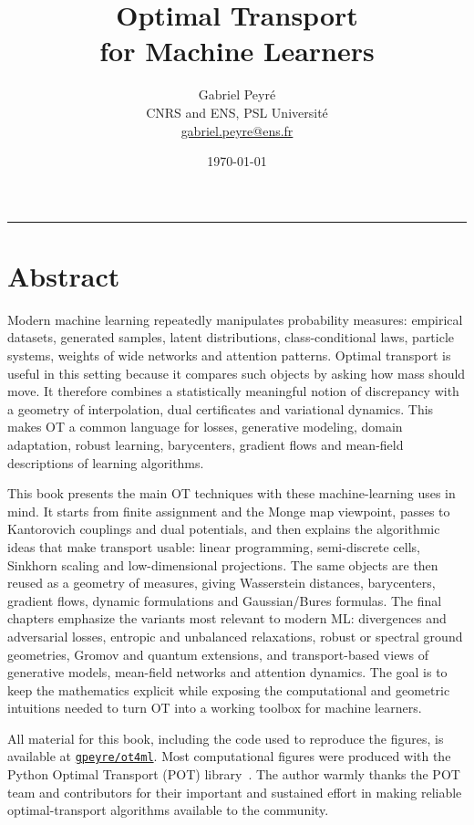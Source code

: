 \documentclass[10pt,a4paper,twoside,openany]{book}
\title{Optimal Transport\\for Machine Learners}
\author{%
\begin{tabular}{c}
	Gabriel Peyr{\'e} \\ CNRS and ENS, PSL Universit\'e \\
	 \url{gabriel.peyre@ens.fr}
\end{tabular}
}
\date{\today}
\makeatletter
\renewcommand{\maketitle}{%
\begin{titlepage}
\thispagestyle{empty}
\vspace*{.08\textheight}
\noindent{\color{otblue}\rule{\textwidth}{1.1pt}}\par
\vspace{1.4cm}
{\centering\fontsize{30}{36}\selectfont\bfseries\color{otblue}\@title\par}
\vspace{1.2cm}
{\centering\large\@author\par}
\vfill
\begin{center}
{\color{otred}\rule{.38\textwidth}{2pt}}\par
\vspace{.65cm}
{\large\@date\par}
\end{center}
\end{titlepage}
}
\makeatother
\begin{document}
\hypersetup{pageanchor=false}
\maketitle
\cleardoublepage
\hypersetup{pageanchor=true}

\frontmatter

\chapter*{Abstract}
Modern machine learning repeatedly manipulates probability measures: empirical datasets, generated samples, latent distributions, class-conditional laws, particle systems, weights of wide networks and attention patterns. Optimal transport is useful in this setting because it compares such objects by asking how mass should move. It therefore combines a statistically meaningful notion of discrepancy with a geometry of interpolation, dual certificates and variational dynamics. This makes OT a common language for losses, generative modeling, domain adaptation, robust learning, barycenters, gradient flows and mean-field descriptions of learning algorithms.

This book presents the main OT techniques with these machine-learning uses in mind. It starts from finite assignment and the Monge map viewpoint, passes to Kantorovich couplings and dual potentials, and then explains the algorithmic ideas that make transport usable: linear programming, semi-discrete cells, Sinkhorn scaling and low-dimensional projections. The same objects are then reused as a geometry of measures, giving Wasserstein distances, barycenters, gradient flows, dynamic formulations and Gaussian/Bures formulas. The final chapters emphasize the variants most relevant to modern ML: divergences and adversarial losses, entropic and unbalanced relaxations, robust or spectral ground geometries, Gromov and quantum extensions, and transport-based views of generative models, mean-field networks and attention dynamics. The goal is to keep the mathematics explicit while exposing the computational and geometric intuitions needed to turn OT into a working toolbox for machine learners.

All material for this book, including the code used to reproduce the figures, is available at \href{http://github.com/gpeyre/ot4ml}{\texttt{gpeyre/ot4ml}}. Most computational figures were produced with the Python Optimal Transport (POT) library~\cite{flamary2021pot}. The author warmly thanks the POT team and contributors for their important and sustained effort in making reliable optimal-transport algorithms available to the community.
\end{document}
